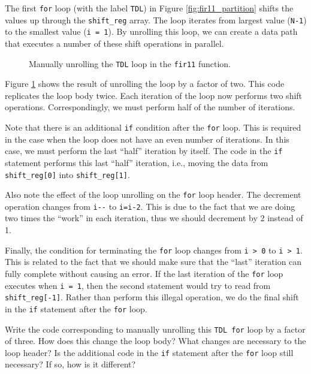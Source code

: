 The first \lstinline{for} loop (with the label \lstinline{TDL}) in Figure \ref{fig:fir11_partition} shifts the values up through the \lstinline{shift_reg} array. The loop iterates from largest value (\lstinline{N-1}) to the smallest value (\lstinline{i = 1}). By unrolling this loop, we can create a data path that executes a number of these shift operations in parallel. 

\begin{figure}

\caption{ Manually unrolling the \lstinline{TDL} loop in the \lstinline{fir11} function.  }
\label{fig:fir11_unrollTDL}
\end{figure}

Figure \ref{fig:fir11_unrollTDL} shows the result of unrolling the loop by a factor of two. This code replicates the loop body twice. Each iteration of the loop now performs two shift operations. Correspondingly, we must perform half of the number of iterations.

Note that there is an additional \lstinline{if} condition after the \lstinline{for} loop. This is required in the case when the loop does not have an even number of iterations. In this case, we must perform the last ``half'' iteration by itself. The code in the \lstinline{if} statement performs this last ``half'' iteration, i.e., moving the data from \lstinline{shift_reg[0]} into \lstinline{shift_reg[1]}.

Also note the effect of the loop unrolling on the \lstinline{for} loop header. The decrement operation changes from \lstinline{i--} to \lstinline{i=i-2}. This is due to the fact that we are doing two times the ``work'' in each iteration, thus we should decrement by 2 instead of 1.

Finally, the condition for terminating the \lstinline{for} loop changes from \lstinline{i > 0} to \lstinline{i > 1}. This is related to the fact that we should make sure that the ``last'' iteration can fully complete without causing an error. If the last iteration of the \lstinline{for} loop executes when \lstinline{i = 1}, then the second statement would try to read from \lstinline{shift_reg[-1]}. Rather than perform this illegal operation, we do the final shift in the \lstinline{if} statement after the \lstinline{for} loop. 

\begin{exercise}
Write the code corresponding to manually unrolling this \lstinline{TDL for} loop by a factor of three. How does this change the loop body? What changes are necessary to the loop header? Is the additional code in the \lstinline{if} statement after the \lstinline{for} loop still necessary? If so, how is it different?
\end{exercise}

